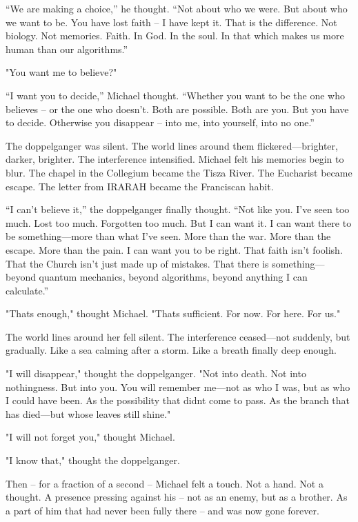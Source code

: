 \documentclass[
]{article}
\begin{document}
``We are making a choice,'' he thought. ``Not about who we were. But about who we want to be. You have lost faith -- I have kept it. That is the difference. Not biology. Not memories. Faith. In God. In the soul. In that which makes us more human than our algorithms.''

"You want me to believe?"

``I want you to decide,'' Michael thought. ``Whether you want to be the one who believes -- or the one who doesn't. Both are possible. Both are you. But you have to decide. Otherwise you disappear -- into me, into yourself, into no one.''

The doppelganger was silent. The world lines around them flickered---brighter, darker, brighter. The interference intensified. Michael felt his memories begin to blur. The chapel in the Collegium became the Tisza River. The Eucharist became escape. The letter from IRARAH became the Franciscan habit.

``I can't believe it,'' the doppelganger finally thought. ``Not like you. I've seen too much. Lost too much. Forgotten too much. But I can want it. I can want there to be something---more than what I've seen. More than the war. More than the escape. More than the pain. I can want you to be right. That faith isn't foolish. That the Church isn't just made up of mistakes. That there is something---beyond quantum mechanics, beyond algorithms, beyond anything I can calculate.''

"That\textquotesingle s enough," thought Michael. "That\textquotesingle s sufficient. For now. For here. For us."

The world lines around her fell silent. The interference ceased---not suddenly, but gradually. Like a sea calming after a storm. Like a breath finally deep enough.

"I will disappear," thought the doppelganger. "Not into death. Not into nothingness. But into you. You will remember me---not as who I was, but as who I could have been. As the possibility that didn\textquotesingle t come to pass. As the branch that has died---but whose leaves still shine."

"I will not forget you," thought Michael.

"I know that," thought the doppelganger.

Then -- for a fraction of a second -- Michael felt a touch. Not a hand. Not a thought. A presence pressing against his -- not as an enemy, but as a brother. As a part of him that had never been fully there -- and was now gone forever.
\end{document}
